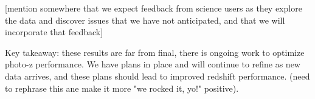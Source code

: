 [mention somewhere that we expect feedback from science users as they explore the data and discover issues that we have not anticipated, and that we will incorporate that feedback]

Key takeaway: these results are far from final, there is ongoing work to optimize photo-z performance.  We have plans in place and will continue to refine as new data arrives, and these plans should lead to improved redshift performance. (need to rephrase this ane make it more "we rocked it, yo!" positive).




\pagebreak



